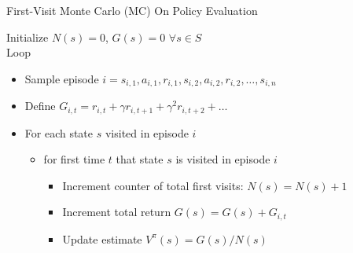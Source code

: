 \documentclass[aspectratio=169]{../latex_main/tntbeamer}  %
\begin{document}
\begin{frame}[c]{First-Visit Monte Carlo (MC) On Policy Evaluation}

Initialize $N(s) = 0$, $G(s) = 0$ $\forall s \in S$\\
Loop 
\begin{itemize}
	\item Sample episode $i = s_{i,1}, a_{i,1}, r_{i,1}, s_{i,2}, a_{i,2}, r_{i,2}, \ldots,s_{i,n}$
	\item Define $G_{i,t} = r_{i,t} + \gamma r_{i,t+1} + \gamma^2 r_{i,t+2} + \ldots$
	\item For each state $s$ visited in episode $i$
	\begin{itemize}
		\item for first time $t$ that state $s$ is visited in episode $i$
		\begin{itemize}
			\item Increment counter of total first visits: $N(s) = N(s) + 1$
			\item Increment total return $G(s) = G(s) + G_{i,t}$
			\item Update estimate $V^\pi (s) = G(s) /N(s)$
		\end{itemize}
	\end{itemize}
\end{itemize}
	
\end{frame}
\end{document}
